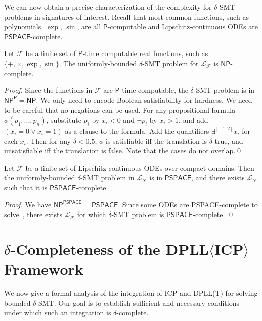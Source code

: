 \documentclass[envcountsect]{llncs}
\begin{document}
We can now obtain a precise characterization of the complexity for $\delta$-SMT problems in signatures of interest. Recall that most common functions, such as polynomials, $\exp$, $\sin$, are all $\mathsf{P}$-computable and Lipschitz-continuous ODEs are $\mathsf{PSPACE}$-complete. 
\begin{corollary}
Let $\mathcal{F}$ be a finite set of $\mathsf{P}$-time computable real functions, such as $\{+, \times, \exp, \sin\}$. The uniformly-bounded $\delta$-SMT problem for $\mathcal{L}_{\mathcal{F}}$ is $\mathsf{NP}$-complete.
\end{corollary}
\begin{proof}
Since the functions in $\mathcal{F}$ are $\mathsf{P}$-time computable, the $\delta$-SMT problem is in $\mathsf{NP^P}= \mathsf{NP}$. We only need to encode Boolean satisfiability for hardness. We need to be careful that no negations can be used. For any propositional formula $\phi(p_1,...,p_n)$, substitute $p_i$ by $x_i<0$ and $\neg p_i$ by $x_i>1$, and add $(x_i=0\vee x_i=1)$ as a clause to the formula. Add the quantifiers $\exists^{[-1,2]}x_i$ for each $x_i$. Then for any $\delta<0.5$, $\phi$ is satisfiable iff the translation is $\delta$-true, and unsatisfiable iff the translation is false. Note that the cases do not overlap.\qed 
\end{proof}
\begin{corollary}
Let $\mathcal{F}$ be a finite set of Lipschitz-continuous ODEs over compact domains. Then the uniformly-bounded $\delta$-SMT problem in $\mathcal{L}_{\mathcal{F}}$ is in $\mathsf{PSPACE}$, and there exists $\mathcal{L}_{\mathcal{F}}$ such that it is $\mathsf{PSPACE}$-complete.
\end{corollary}
\begin{proof}
We have $\mathsf{NP^{PSPACE}} = \mathsf{PSPACE}$. Since some ODEs are {\sf PSPACE}-complete to solve~\cite{Kawamura09}, there exists $\mathcal{L}_{\mathcal{F}}$ for which $\delta$-SMT problem is $\mathsf{PSPACE}$-complete. \qed
\end{proof}
\section{$\delta$-Completeness of the DPLL$\langle$ICP$\rangle$ Framework}\label{dpllicp}
We now give a formal analysis of the integration of ICP and DPLL(T) for solving bounded $\delta$-SMT. Our goal is to establish sufficient and necessary conditions under which such an integration is $\delta$-complete. 
\end{document}
